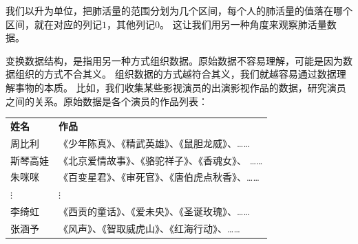 \documentclass[12pt,UTF8,fontset=none]{ctexbook}
\begin{document}
我们以升为单位，把肺活量的范围分划为几个区间，每个人的肺活量的值落在哪个区间，就在对应的列记$1$，其他列记$0$。
这让我们用另一种角度来观察肺活量数据。

变换数据结构，是指用另一种方式组织数据。原始数据不容易理解，可能是因为数据组织的方式不合其义。
组织数据的方式越符合其义，我们就越容易通过数据理解事物的本质。
比如，我们收集某些影视演员的出演影视作品的数据，研究演员之间的关系。原始数据是各个演员的作品列表：
\begin{center}
    \begin{tabular}{ p{4em}<{\centering} !{\color{white} \vrule width 2pt} p{22em}<{\centering} }
         \textbf{姓名} & \textbf{作品} \\ [0.5ex] 
         周比利 & 《少年陈真》、《精武英雄》、《鼠胆龙威》、…… \\  
         斯琴高娃 & 《北京爱情故事》、《骆驼祥子》、《香魂女》、 …… \\  
         朱咪咪 & 《百变星君》、《审死官》、《唐伯虎点秋香》、…… \\  
         $\vdots$ & $\vdots$ \\  
         李绮虹 & 《西贡的童话》、《爱未央》、《圣诞玫瑰》、…… \\  
         张涵予 & 《风声》、《智取威虎山》、《红海行动》、…… \\  
    \end{tabular}
\end{center}
\end{document}
